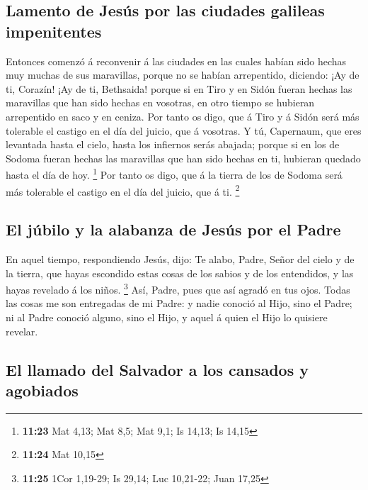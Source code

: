 \hypertarget{lamento-de-jesuxfas-por-las-ciudades-galileas-impenitentes}{%
\subsection{Lamento de Jesús por las ciudades galileas
impenitentes}\label{lamento-de-jesuxfas-por-las-ciudades-galileas-impenitentes}}

 Entonces comenzó á reconvenir á las ciudades en las cuales
habían sido hechas muy muchas de sus maravillas, porque no se habían
arrepentido, diciendo:  ¡Ay de ti, Corazín! ¡Ay de ti,
Bethsaida! porque si en Tiro y en Sidón fueran hechas las maravillas que
han sido hechas en vosotras, en otro tiempo se hubieran arrepentido en
saco y en ceniza.  Por tanto os digo, que á Tiro y á Sidón
será más tolerable el castigo en el día del juicio, que á vosotras.
 Y tú, Capernaum, que eres levantada hasta el cielo, hasta
los infiernos serás abajada; porque si en los de Sodoma fueran hechas
las maravillas que han sido hechas en ti, hubieran quedado hasta el día
de hoy. \footnote{\textbf{11:23} Mat 4,13; Mat 8,5; Mat 9,1; Is 14,13;
  Is 14,15}  Por tanto os digo, que á la tierra de los de
Sodoma será más tolerable el castigo en el día del juicio, que á ti.
\footnote{\textbf{11:24} Mat 10,15}

\hypertarget{el-juxfabilo-y-la-alabanza-de-jesuxfas-por-el-padre}{%
\subsection{El júbilo y la alabanza de Jesús por el
Padre}\label{el-juxfabilo-y-la-alabanza-de-jesuxfas-por-el-padre}}

 En aquel tiempo, respondiendo Jesús, dijo: Te alabo,
Padre, Señor del cielo y de la tierra, que hayas escondido estas cosas
de los sabios y de los entendidos, y las hayas revelado á los niños.
\footnote{\textbf{11:25} 1Cor 1,19-29; Is 29,14; Luc 10,21-22; Juan
  17,25}  Así, Padre, pues que así agradó en tus ojos.
 Todas las cosas me son entregadas de mi Padre: y nadie
conoció al Hijo, sino el Padre; ni al Padre conoció alguno, sino el
Hijo, y aquel á quien el Hijo lo quisiere revelar.

\hypertarget{el-llamado-del-salvador-a-los-cansados-y-agobiados}{%
\subsection{El llamado del Salvador a los cansados
\hspace{0pt}\hspace{0pt}y
agobiados}\label{el-llamado-del-salvador-a-los-cansados-y-agobiados}}

